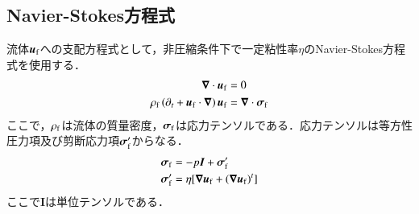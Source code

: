 \documentclass[11pt,a4j]{jarticle}
\begin{document}
\subsection{Navier-Stokes方程式}
\par 流体$\boldsymbol{u}_{\rm{f}}$への支配方程式として，非圧縮条件下で一定粘性率$\eta$のNavier-Stokes方程式を使用する．
\begin{align}
      \boldsymbol{\nabla}\cdot{\boldsymbol{u}}_{\rm{f}}&=0
	   \\
      \rho_{\rm f}\left(\partial_t+{\boldsymbol{u}}_{\rm{f}}\cdot\boldsymbol{\nabla}\right){\boldsymbol{u}}_{\rm{f}}&=\boldsymbol{\nabla}\cdot\boldsymbol{\sigma}_{\rm{f}}
\end{align}
\label{Navier_Stokes}
\noindent
ここで，$\rho_{\rm f}$は流体の質量密度，$\boldsymbol{\sigma}_{\rm{f}}$は応力テンソルである．応力テンソルは等方性圧力項及び剪断応力項$\boldsymbol{\sigma}_{\rm{f}}^\prime$からなる．
\begin{align}
   \boldsymbol{\sigma}_{\rm{f}}&=-p\boldsymbol{I}+\boldsymbol{\sigma}_{\rm{f}}^\prime
      \\
   \boldsymbol{\sigma}_{\rm{f}}^\prime&=\eta[\boldsymbol{\nabla}{\boldsymbol{u}}_{\rm{f}}+(\boldsymbol{\nabla}{\boldsymbol{u}}_{\rm{f}})^t]
\end{align}
\label{sigma}
\noindent
ここで$\boldsymbol{I}$は単位テンソルである．
\end{document}
